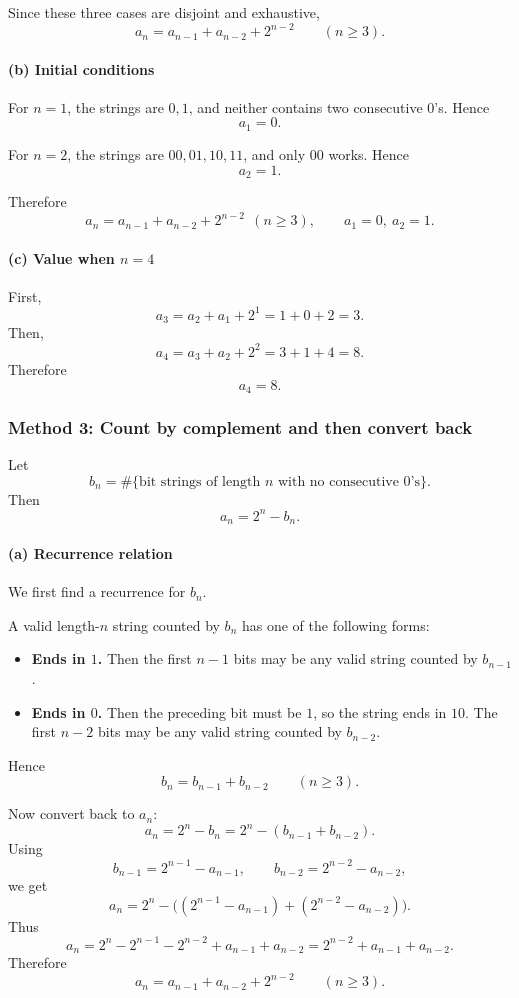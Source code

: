 \documentclass[12pt]{article}
\begin{document}
Since these three cases are disjoint and exhaustive,
\[
\boxed{a_n=a_{n-1}+a_{n-2}+2^{n-2}\qquad (n\ge 3).}
\]

\paragraph{(b) Initial conditions}
For \(n=1\), the strings are \(0,1\), and neither contains two consecutive \(0\)'s. Hence
\[
\boxed{a_1=0.}
\]

For \(n=2\), the strings are \(00,01,10,11\), and only \(00\) works. Hence
\[
\boxed{a_2=1.}
\]

Therefore
\[
\boxed{a_n=a_{n-1}+a_{n-2}+2^{n-2}\ \ (n\ge 3),\qquad a_1=0,\ a_2=1.}
\]

\paragraph{(c) Value when \(n=4\)}
First,
\[
a_3=a_2+a_1+2^1=1+0+2=3.
\]
Then,
\[
a_4=a_3+a_2+2^2=3+1+4=8.
\]
Therefore
\[
\boxed{a_4=8.}
\]

\subsubsection*{Method 3: Count by complement and then convert back}

Let
\[
b_n=\#\{\text{bit strings of length }n\text{ with no consecutive }0\text{'s}\}.
\]
Then
\[
a_n=2^n-b_n.
\]

\paragraph{(a) Recurrence relation}
We first find a recurrence for \(b_n\).

A valid length-\(n\) string counted by \(b_n\) has one of the following forms:

\begin{itemize}[leftmargin=*]
  \item \textbf{Ends in \(1\).}  
  Then the first \(n-1\) bits may be any valid string counted by \(b_{n-1}\).

  \item \textbf{Ends in \(0\).}  
  Then the preceding bit must be \(1\), so the string ends in \(10\).  
  The first \(n-2\) bits may be any valid string counted by \(b_{n-2}\).
\end{itemize}

Hence
\[
b_n=b_{n-1}+b_{n-2}\qquad (n\ge 3).
\]

Now convert back to \(a_n\):
\[
a_n=2^n-b_n
=2^n-(b_{n-1}+b_{n-2}).
\]
Using
\[
b_{n-1}=2^{n-1}-a_{n-1},\qquad b_{n-2}=2^{n-2}-a_{n-2},
\]
we get
\[
a_n
=2^n-\bigl((2^{n-1}-a_{n-1})+(2^{n-2}-a_{n-2})\bigr).
\]
Thus
\[
a_n
=2^n-2^{n-1}-2^{n-2}+a_{n-1}+a_{n-2}
=2^{n-2}+a_{n-1}+a_{n-2}.
\]
Therefore
\[
\boxed{a_n=a_{n-1}+a_{n-2}+2^{n-2}\qquad (n\ge 3).}
\]
\end{document}
